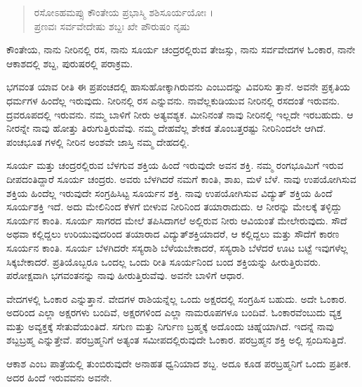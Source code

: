 \begin{verse}
ರಸೋಽಹಮಪ್ಸು ಕೌಂತೇಯ ಪ್ರಭಾಸ್ಮಿ ಶಶಿಸೂರ್ಯಯೋಃ ।\\ಪ್ರಣವಃ ಸರ್ವವೇದೇಷು ಶಬ್ದಃ ಖೇ ಪೌರುಷಂ ನೃಷು 
\end{verse}

{\small ಕೌಂತೇಯ, ನಾನು ನೀರಿನಲ್ಲಿ ರಸ, ನಾನು ಸೂರ್ಯ ಚಂದ್ರರಲ್ಲಿರುವ ತೇಜಸ್ಸು, ನಾನು ಸರ್ವವೇದಗಳ ಓಂಕಾರ, ನಾನೇ ಆಕಾಶದಲ್ಲಿ ಶಬ್ದ, ಪುರುಷರಲ್ಲಿ ಪರಾಕ್ರಮ.}

ಭಗವಂತ ಯಾವ ರೀತಿ ಈ ಪ್ರಪಂಚದಲ್ಲಿ ಹಾಸುಹೋಕ್ಕಾಗಿರುವನು ಎಂಬುದನ್ನು ವಿವರಿಸು ತ್ತಾನೆ. ಅವನೇ ಪ್ರಕೃತಿಯ ಧರ್ಮಗಳ ಹಿಂದೆಲ್ಲ ಇರುವುದು. ನೀರಿನಲ್ಲಿ ರಸ ಎನ್ನುವನು. ನಾವೆಲ್ಲಕುಡಿಯುವ ನೀರಿನಲ್ಲಿ ರಸದಂತೆ ಇರುವನು. ದ್ರವರೂಪದಲ್ಲಿ ಇರುವನು. ನಮ್ಮ ಬಾಳಿಗೆ ನೀರು ಅತ್ಯವಶ್ಯಕ. ಮೀನಿನಂತೆ ನಾವು ನೀರಿನಲ್ಲಿ ಇಲ್ಲದೇ ಇರಬಹುದು. ಆ ನೀರನ್ನೇ ನಾವು ಹೋತ್ತು ತಿರುಗುತ್ತಿರುವೆವು. ನಮ್ಮ ದೇಹವೆಲ್ಲ ಶೇಕಡ ತೊಂಬತ್ತರಷ್ಟು ನೀರಿನಿಂದಲೇ ಆಗಿದೆ. ಪಂಚಭೂತ ಗಳಲ್ಲಿ ನೀರಿನ ಅಂಶವೇ ಜಾಸ್ತಿ ನಮ್ಮ ದೇಹದಲ್ಲಿ.

ಸೂರ್ಯ ಮತ್ತು ಚಂದ್ರರಲ್ಲಿರುವ ಬೆಳಗುವ ಶಕ್ತಿಯ ಹಿಂದೆ ಇರುವುದೇ ಅವನ ಶಕ್ತಿ. ನಮ್ಮ ರಂಗಭೂಮಿಗೆ ಇರುವ ದೀಪದಂತಿದ್ದಾರೆ ಸೂರ್ಯ ಚಂದ್ರರು. ಅವರು ಬೆಳಗಿದರೆ ನಮಗೆ ಕಾಂತಿ, ಶಾಖ, ಮಳೆ ಬೆಳೆ. ನಾವು ಉಪಯೋಗಿಸುವ ಶಕ್ತಿಯ ಹಿಂದೆಲ್ಲ ಇರುವುದೇ ಸಂಗ್ರಹಿಸಿಟ್ಟ ಸೂರ್ಯನ ಶಕ್ತಿ. ನಾವು ಉಪಯೋಗಿಸುವ ವಿದ್ಯುತ್ ಶಕ್ತಿಯ ಹಿಂದೆ ಸೂರ್ಯಶಕ್ತಿ ಇದೆ. ಅದು ಮೇಲಿನಿಂದ ಕೆಳಗೆ ಬೀಳುವ ನೀರಿನಿಂದ ತಯಾರಾದುದು. ಆ ನೀರನ್ನು ಮೇಲಕ್ಕೆ ತಳ್ಳಿದ್ದು ಸೂರ್ಯನ ಕಾಂತಿ. ಸೂರ್ಯ ಸಾಗರದ ಮೇಲೆ ತಪಿಸಿದಾಗಲೆ ಅಲ್ಲಿರುವ ನೀರು ಆವಿಯಂತೆ ಮೇಲೇರುವುದು. ಸೌದೆ ಅಥವಾ ಕಲ್ಲಿದ್ದಲು ಉರಿಯುವುದರಿಂದ ತಯಾರಾದ ವಿದ್ಯುತ್​ಶಕ್ತಿಯಾದರೆ, ಆ ಕಲ್ಲಿದ್ದಲು ಮತ್ತು ಸೌದೆಗೆ ಕಾರಣ ಸೂರ್ಯನ ಕಾಂತಿ. ಸೂರ್ಯ ಬೆಳಗಿದರೇ ಸಸ್ಯರಾಶಿ ಬೆಳೆಯಬೇಕಾದರೆ, ಸಸ್ಯರಾಶಿ ಬೆಳೆದರೆ ಊಟ ಬಟ್ಟೆ ಇವುಗಳೆಲ್ಲ ಸಿಕ್ಕಬೇಕಾದರೆ. ಪ್ರತಿಯೊಬ್ಬರೂ ಒಂದಲ್ಲ ಒಂದು ರೀತಿ ಸೂರ್ಯನಿಂದ ಬಂದ ಶಕ್ತಿಯನ್ನು ಹೀರುತ್ತಿರುವರು. ಪರೋಕ್ಷವಾಗಿ ಭಗವಂತನನ್ನು ನಾವು ಹೀರುತ್ತಿರುವೆವು. ಅವನೇ ಬಾಳಿಗೆ ಆಧಾರ.

ವೇದಗಳಲ್ಲಿ ಓಂಕಾರ ಎನ್ನುತ್ತಾನೆ. ವೇದಗಳ ರಾಶಿಯನ್ನೆಲ್ಲ ಒಂದು ಅಕ್ಷರದಲ್ಲಿ ಸಂಗ್ರಹಿಸ ಬಹುದು. ಅದೇ ಓಂಕಾರ. ಅದರಿಂದ ಎಲ್ಲಾ ಅಕ್ಷರಗಳು ಬಂದಿವೆ, ಅಕ್ಷರಗಳಿಂದ ಎಲ್ಲಾ ನಾಮರೂಪಗಳೂ ಬಂದಿವೆ. ಓಂಕಾರವೆಂಬುದು ವ್ಯಕ್ತ ಮತ್ತು ಅವ್ಯಕ್ತಕ್ಕೆ ಸೇತುವೆಯಂತಿದೆ. ಸಗುಣ ಮತ್ತು ನಿರ್ಗುಣ ಬ್ರಹ್ಮಕ್ಕೆ ಅದೊಂದು ಚಿಹ್ನೆಯಾಗಿದೆ. ಇದನ್ನೆ ನಾವು ಶಬ್ದಬ್ರಹ್ಮ ಎನ್ನುತ್ತೇವೆ. ಪರಬ್ರಹ್ಮನಿಗೆ ಅತ್ಯಂತ ಸಮೀಪದಲ್ಲಿರುವುದೇ ಓಂಕಾರ. ಪರಬ್ರಹ್ಮನ ಶಕ್ತಿ ಅಲ್ಲಿ ಸ್ಪಂದಿಸುತ್ತಿದೆ.

ಆಕಾಶ ಎಂಬ ಪಾತ್ರೆಯಲ್ಲಿ ತುಂಬಿರುವುದೇ ಅನಾಹತ ಧ್ವನಿಯಾದ ಶಬ್ದ. ಅದೂ ಕೂಡ ಪರಬ್ರಹ್ಮನಿಗೆ ಒಂದು ಪ್ರತೀಕ. ಅದರ ಹಿಂದೆ ಇರುವವನು ಅವನೇ.

